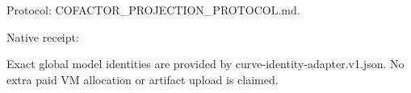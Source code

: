 \documentclass[10pt]{article}
\begin{document}
\begin{flushleft}\footnotesize
Protocol: COFACTOR_PROJECTION_PROTOCOL.md.\par
Native receipt: \par
Exact global model identities are provided by curve-identity-adapter.v1.json.
No extra paid VM allocation or artifact upload is claimed.
\end{flushleft}
\end{document}
